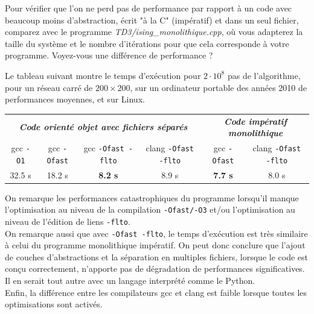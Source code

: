 \documentclass{book}
\def\filename{\emph}
\begin{document}
Pour vérifier que l'on ne perd pas de performance par rapport à un code avec beaucoup moins d'abstraction, écrit "à la C" (impératif) et dans un seul fichier, comparez avec le programme \filename{TD3/ising\_monolithique.cpp}, où vous adapterez la taille du système et le nombre d'itérations pour que cela corresponde à votre programme. Voyez-vous une différence de performance ?

\begin{correction}
Le tableau suivant montre le temps d'exécution pour $2\cdot 10^8$ pas de l'algorithme, pour un réseau carré de $200 \times 200$, sur un ordinateur portable des années 2010 de performances moyennes, et sur Linux.
\begin{table}[H]
\hspace*{-0.45cm}%
\begin{tabular}{cccc|cc}
\hline
\multicolumn{4}{c|}{\textit{\textbf{Code orienté objet avec fichiers séparés}}}                                                                                 & \multicolumn{2}{c}{\textit{\textbf{Code impératif monolithique}}}      \\
\multicolumn{1}{c|}{gcc \texttt{-O1}} & \multicolumn{1}{c|}{gcc \texttt{-Ofast}} & \multicolumn{1}{c|}{gcc \texttt{-Ofast -flto}} & clang \texttt{-Ofast -flto} & \multicolumn{1}{c|}{gcc \texttt{-Ofast}} & clang \texttt{-Ofast -flto} \\ \hline
\multicolumn{1}{c|}{32.5 s}           & \multicolumn{1}{c|}{18.2 s}              & \multicolumn{1}{c|}{\textbf{8.2 s}}            & 8.9 s                       & \multicolumn{1}{c|}{\textbf{7.7 s}}      & 8.0 s                       \\ \hline
\end{tabular}
\end{table}
On remarque les performances catastrophiques du programme lorsqu'il manque l'optimisation au niveau de la compilation \texttt{-Ofast/-O3} et/ou l'optimisation au niveau de l'édition de liens \texttt{-flto}.\\

On remarque aussi que avec \texttt{-Ofast -flto}, le temps d'exécution est très similaire à celui du programme monolithique impératif. On peut donc conclure que l'ajout de couches d'abstractions et la séparation en multiples fichiers, lorsque le code est conçu correctement, n'apporte pas de dégradation de performances significatives. Il en serait tout autre avec un langage interprété comme le Python.\\

Enfin, la différence entre les compilateurs gcc et clang est faible lorsque toutes les optimisations sont activés.
\end{correction}
\end{document}
